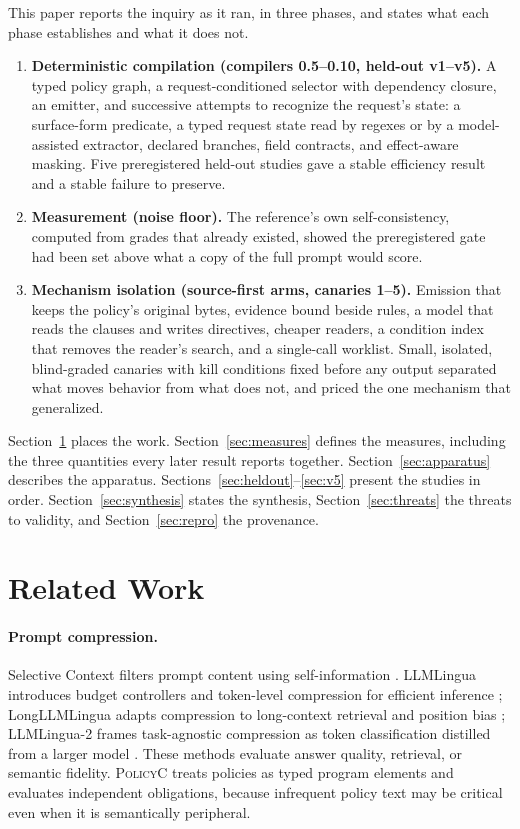 \documentclass[11pt]{article}
\newcommand{\policyc}{\textsc{PolicyC}\xspace}
\begin{document}
This paper reports the inquiry as it ran, in three phases, and states what each phase establishes and what it does not.

\begin{enumerate}
  \item \textbf{Deterministic compilation (compilers 0.5--0.10, held-out v1--v5).} A typed policy graph, a request-conditioned selector with dependency closure, an emitter, and successive attempts to recognize the request's state: a surface-form predicate, a typed request state read by regexes or by a model-assisted extractor, declared branches, field contracts, and effect-aware masking. Five preregistered held-out studies gave a stable efficiency result and a stable failure to preserve.
  \item \textbf{Measurement (noise floor).} The reference's own self-consistency, computed from grades that already existed, showed the preregistered gate had been set above what a copy of the full prompt would score.
  \item \textbf{Mechanism isolation (source-first arms, canaries 1--5).} Emission that keeps the policy's original bytes, evidence bound beside rules, a model that reads the clauses and writes directives, cheaper readers, a condition index that removes the reader's search, and a single-call worklist. Small, isolated, blind-graded canaries with kill conditions fixed before any output separated what moves behavior from what does not, and priced the one mechanism that generalized.
\end{enumerate}

Section~\ref{sec:related} places the work. Section~\ref{sec:measures} defines the measures, including the three quantities every later result reports together. Section~\ref{sec:apparatus} describes the apparatus. Sections~\ref{sec:heldout}--\ref{sec:v5} present the studies in order. Section~\ref{sec:synthesis} states the synthesis, Section~\ref{sec:threats} the threats to validity, and Section~\ref{sec:repro} the provenance.

\section{Related Work}
\label{sec:related}

\paragraph{Prompt compression.}
Selective Context filters prompt content using self-information \cite{selectivecontext}. LLMLingua introduces budget controllers and token-level compression for efficient inference \cite{llmlingua}; LongLLMLingua adapts compression to long-context retrieval and position bias \cite{longllmlingua}; LLMLingua-2 frames task-agnostic compression as token classification distilled from a larger model \cite{llmlingua2}. These methods evaluate answer quality, retrieval, or semantic fidelity. \policyc treats policies as typed program elements and evaluates independent obligations, because infrequent policy text may be critical even when it is semantically peripheral.
\end{document}
